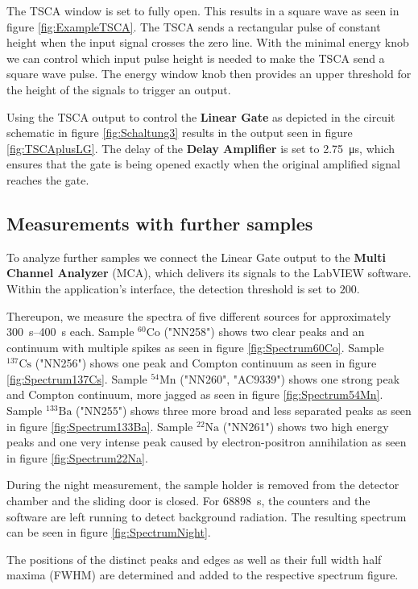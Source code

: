 The TSCA window is set to fully open.
This results in a square wave as seen in figure \ref{fig:ExampleTSCA}.
The TSCA sends a rectangular pulse of constant height when the input signal crosses the zero line.
With the minimal energy knob we can control which input pulse height is needed to make the TSCA send a square wave pulse.
The energy window knob then provides an upper threshold for the height of the signals to trigger an output.
%
\par
%
Using the TSCA output to control the \textbf{Linear Gate} as depicted in the circuit schematic in figure \ref{fig:Schaltung3} results in the output seen in figure \ref{fig:TSCAplusLG}.
The delay of the \textbf{Delay Amplifier} is set to \SI{2.75}{\micro\second}, which ensures that the gate is being opened exactly when the original amplified signal reaches the gate.
%
\subsection{Measurements with further samples}
%
To analyze further samples we connect the Linear Gate output to the \textbf{Multi Channel Analyzer} (MCA), which delivers its signals to the LabVIEW software.
Within the application's interface, the detection threshold is set to $200$.
%
\par
%
Thereupon, we measure the spectra of five different sources for approximately \SIrange{300}{400}{\second} each.
Sample $^{60}\text{Co}$ ("NN258") shows two clear peaks and an continuum with multiple spikes as seen in figure \ref{fig:Spectrum60Co}.
Sample $^{137}\text{Cs}$ ("NN256") shows one peak and Compton continuum as seen in figure \ref{fig:Spectrum137Cs}.
Sample $^{54}\text{Mn}$ ("NN260", "AC9339") shows one strong peak and Compton continuum, more jagged as seen in figure \ref{fig:Spectrum54Mn}.
Sample $^{133}\text{Ba}$ ("NN255") shows three more broad and less separated peaks as seen in figure \ref{fig:Spectrum133Ba}.
Sample $^{22}\text{Na}$ ("NN261") shows two high energy peaks and one very intense peak caused by electron-positron annihilation as seen in figure \ref{fig:Spectrum22Na}.
%
\par
%
During the night measurement, the sample holder is removed from the detector chamber and the sliding door is closed.
For \SI{68898}{\second}, the counters and the software are left running to detect background radiation.
The resulting spectrum can be seen in figure \ref{fig:SpectrumNight}.
%
\par
%
The positions of the distinct peaks and edges as well as their full width half maxima (FWHM) are determined and added to the respective spectrum figure.
%
